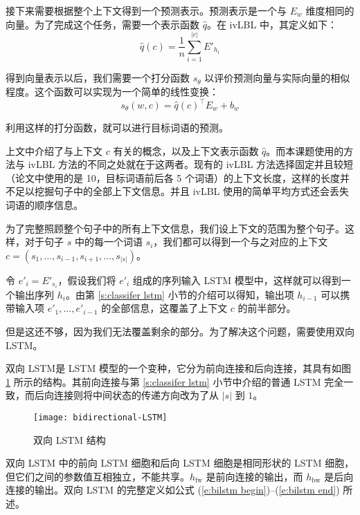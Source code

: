 接下来需要根据整个上下文得到一个预测表示。预测表示是一个与 $E_w$ 维度相同的向量。为了完成这个任务，需要一个表示函数 $\hat{q}$。在 ivLBL 中，其定义如下：
\begin{equation}
\hat{q}(c) = \frac{1}{n}\sum_{i = 1}^{|c|}E'_{h_i}
\end{equation}

得到向量表示以后，我们需要一个打分函数 $s_\theta$ 以评价预测向量与实际向量的相似程度。这个函数可以实现为一个简单的线性变换：
\begin{equation}
s_\theta(w, c) = \hat{q}(c)^\intercal E_w + b_w
\label{e:scoring}
\end{equation}

利用这样的打分函数，就可以进行目标词语的预测。

上文中介绍了与上下文 $c$ 有关的概念，以及上下文表示函数 $\hat{q}$。而本课题使用的方法与 ivLBL 方法的不同之处就在于这两者。现有的 ivLBL 方法选择固定并且较短（论文中使用的是 10，目标词语前后各 5 个词语）的上下文长度，这样的长度并不足以挖掘句子中的全部上下文信息。并且 ivLBL 使用的简单平均方式还会丢失词语的顺序信息。

为了完整照顾整个句子中的所有上下文信息，我们设上下文的范围为整个句子。这样，对于句子 $s$ 中的每一个词语 $s_i$，我们都可以得到一个与之对应的上下文 $c = (s_1, \dots, s_{i - 1}, s_{i + 1}, \dots, s_{|s|})$。

令 $e'_i = E'_{s_i}$，假设我们将 $e'_i$ 组成的序列输入 LSTM 模型中，这样就可以得到一个输出序列 $h_i$。由第 \ref{s:classifer lstm} 小节的介绍可以得知，输出项 $h_{i - 1}$ 可以携带输入项 $e'_1, \dots, e'_{i - 1}$ 的全部信息，这覆盖了上下文 $c$ 的前半部分。

但是这还不够，因为我们无法覆盖剩余的部分。为了解决这个问题，需要使用双向 LSTM。

双向 LSTM是 LSTM 模型的一个变种，它分为前向连接和后向连接，其具有如图 \ref{f:bidirectional lstm} 所示的结构。其前向连接与第 \ref{s:classifer lstm} 小节中介绍的普通 LSTM 完全一致，而后向连接则将中间状态的传递方向改为了从 $|s|$ 到 $1$。

\begin{figure}[h]
	\centering
	\texttt{[image: bidirectional-LSTM]}
	\caption{双向 LSTM 结构}
	\label{f:bidirectional lstm}
	\vspace{-1em}
\end{figure}

双向 LSTM 中的前向 LSTM 细胞和后向 LSTM 细胞是相同形状的 LSTM 细胞，但它们之间的参数值互相独立，不能共享。$h_\text{fw}$ 是前向连接的输出，而 $h_\text{bw}$ 是后向连接的输出。双向 LSTM 的完整定义如公式 (\ref{e:bilstm begin})--(\ref{e:bilstm end}) 所述。

